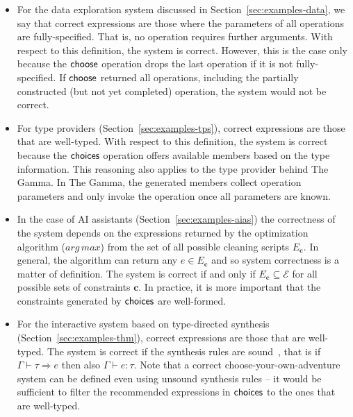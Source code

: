 \documentclass[a4paper,UKenglish,cleveref, autoref, thm-restate]{lipics-v2021}
\newcommand{\ident}[1]{\textsf{#1}}
\newcommand{\select}{\textnormal{\ident{choose}}}
\newcommand{\choices}{\textnormal{\ident{choices}}}
\begin{document}
\begin{itemize}
\setlength{\itemsep}{5pt}
\item For the data exploration system discussed in Section~\ref{sec:examples-data}, we say that
  correct expressions are those where the parameters of all operations are fully-specified.
  That is, no operation requires further arguments. With respect to this definition,
  the system is correct. However, this is the case only because the $\select$ operation drops the last
  operation if it is not fully-specified. If $\select$ returned all operations, including the
  partially constructed (but not yet completed) operation, the system would not be correct.

\item For type providers (Section~\ref{sec:examples-tps}), correct expressions are those that
  are well-typed. With respect to this definition, the system is correct because the $\choices$
  operation offers available members based on the type information. This reasoning also applies to the
  type provider behind The Gamma. In The Gamma, the generated members collect operation parameters
  and only invoke the operation once all parameters are known.

\item In the case of AI assistants (Section~\ref{sec:examples-aias}) the correctness of the system
  depends on the expressions returned by the optimization algorithm ($\mathit{arg\,max}$) from the
  set of all possible cleaning scripts $E_{\boldsymbol{c}}$. In general, the algorithm can return
  any $e\in E_{\boldsymbol{c}}$ and so system correctness is a matter of definition. The system
  is correct if and only if $E_{\boldsymbol{c}}\subseteq\mathcal{E}$ for all possible sets of
  constraints $\boldsymbol{c}$. In practice, it is more important that the constraints generated
  by $\choices$ are well-formed.

\item For the interactive system based on type-directed synthesis (Section~\ref{sec:examples-thm}),
  correct expressions are those that are well-typed. The system is correct if the synthesis rules
  are sound~\cite{osera-2015-synthesis}, that is if $\Gamma \vdash \tau \Rightarrow e$ then also
  $\Gamma \vdash e : \tau$. Note that a correct choose-your-own-adventure system can be defined
  even using unsound synthesis rules -- it would be sufficient to filter the recommended
  expressions in $\choices$ to the ones that are well-typed.
\end{itemize}
\end{document}
